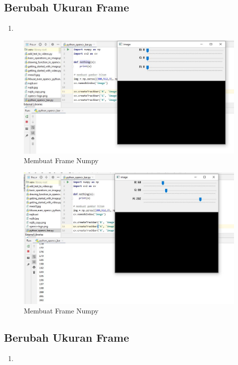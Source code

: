 \newpage
\subsection{Berubah Ukuran Frame}

\begin{enumerate}
	\item
\end{enumerate}

\begin{figure}[ht]
\centering
\includegraphics[scale=0.5]{figures/2,30.jpg}
\caption{Membuat Frame Numpy}
\label{contoh}
\end{figure}

\begin{figure}[ht]
\centering
\includegraphics[scale=0.5]{figures/2,30,1.jpg}
\caption{Membuat Frame Numpy}
\label{contoh}
\end{figure}



\newpage
\subsection{Berubah Ukuran Frame}

\begin{enumerate}
	\item
\end{enumerate}

